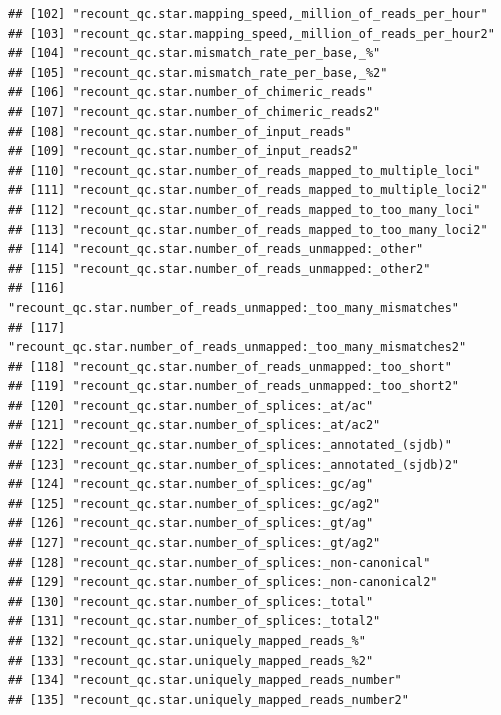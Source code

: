 \documentclass[
]{article}
\begin{document}
\begin{verbatim}
## [102] "recount_qc.star.mapping_speed,_million_of_reads_per_hour"          
## [103] "recount_qc.star.mapping_speed,_million_of_reads_per_hour2"         
## [104] "recount_qc.star.mismatch_rate_per_base,_%"                         
## [105] "recount_qc.star.mismatch_rate_per_base,_%2"                        
## [106] "recount_qc.star.number_of_chimeric_reads"                          
## [107] "recount_qc.star.number_of_chimeric_reads2"                         
## [108] "recount_qc.star.number_of_input_reads"                             
## [109] "recount_qc.star.number_of_input_reads2"                            
## [110] "recount_qc.star.number_of_reads_mapped_to_multiple_loci"           
## [111] "recount_qc.star.number_of_reads_mapped_to_multiple_loci2"          
## [112] "recount_qc.star.number_of_reads_mapped_to_too_many_loci"           
## [113] "recount_qc.star.number_of_reads_mapped_to_too_many_loci2"          
## [114] "recount_qc.star.number_of_reads_unmapped:_other"                   
## [115] "recount_qc.star.number_of_reads_unmapped:_other2"                  
## [116] "recount_qc.star.number_of_reads_unmapped:_too_many_mismatches"     
## [117] "recount_qc.star.number_of_reads_unmapped:_too_many_mismatches2"    
## [118] "recount_qc.star.number_of_reads_unmapped:_too_short"               
## [119] "recount_qc.star.number_of_reads_unmapped:_too_short2"              
## [120] "recount_qc.star.number_of_splices:_at/ac"                          
## [121] "recount_qc.star.number_of_splices:_at/ac2"                         
## [122] "recount_qc.star.number_of_splices:_annotated_(sjdb)"               
## [123] "recount_qc.star.number_of_splices:_annotated_(sjdb)2"              
## [124] "recount_qc.star.number_of_splices:_gc/ag"                          
## [125] "recount_qc.star.number_of_splices:_gc/ag2"                         
## [126] "recount_qc.star.number_of_splices:_gt/ag"                          
## [127] "recount_qc.star.number_of_splices:_gt/ag2"                         
## [128] "recount_qc.star.number_of_splices:_non-canonical"                  
## [129] "recount_qc.star.number_of_splices:_non-canonical2"                 
## [130] "recount_qc.star.number_of_splices:_total"                          
## [131] "recount_qc.star.number_of_splices:_total2"                         
## [132] "recount_qc.star.uniquely_mapped_reads_%"                           
## [133] "recount_qc.star.uniquely_mapped_reads_%2"                          
## [134] "recount_qc.star.uniquely_mapped_reads_number"                      
## [135] "recount_qc.star.uniquely_mapped_reads_number2"                     

\end{verbatim}
\end{document}
